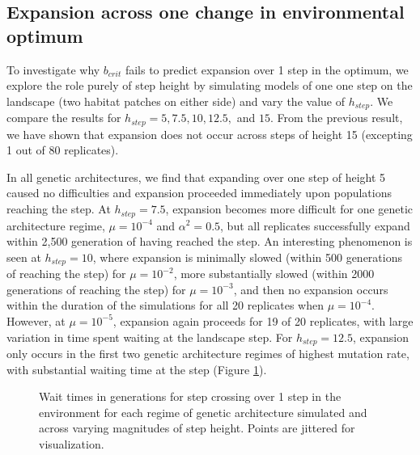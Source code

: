 
\subsection{Expansion across one change in environmental optimum}

To investigate why $b_{crit}$ fails to predict expansion over 1 step in the optimum, we explore the role purely of step height by simulating models of one one step on the landscape (two habitat patches on either side) and vary the value of $h_{step}$. We compare the results for $h_{step} = 5, 7.5, 10, 12.5,$ and $15$. From the previous result, we have shown that expansion does not occur across steps of height 15 (excepting 1 out of 80 replicates).

In all genetic architectures, we find that expanding over one step of height 5 caused no difficulties and expansion proceeded immediately upon populations reaching the step. At $h_{step} = 7.5$, expansion becomes more difficult for one genetic architecture regime, $\mu = 10^{-4}$ and $\alpha^2 = 0.5$, but all replicates successfully expand within 2,500 generation of having reached the step. An interesting phenomenon is seen at $h_{step} = 10$, where expansion is minimally slowed (within 500 generations of reaching the step) for $\mu = 10^{-2}$, more substantially slowed (within 2000 generations of reaching the step) for $\mu = 10^{-3}$, and then no expansion occurs within the duration of the simulations for all 20 replicates when $\mu = 10^{-4}$. However, at $\mu = 10^{-5}$, expansion again proceeds for 19 of 20 replicates, with large variation in time spent waiting at the landscape step. For $h_{step} = 12.5$, expansion only occurs in the first two genetic architecture regimes of highest mutation rate, with substantial waiting time at the step (Figure \ref{fig:waittimes}).



\begin{figure}[h]
\centering
{}
\caption[Wait times for step crossing.]{Wait times in generations for step crossing over 1 step in the environment for each regime of genetic architecture simulated and across varying magnitudes of step height. Points are jittered for visualization.}
\label{fig:waittimes}
\end{figure}

